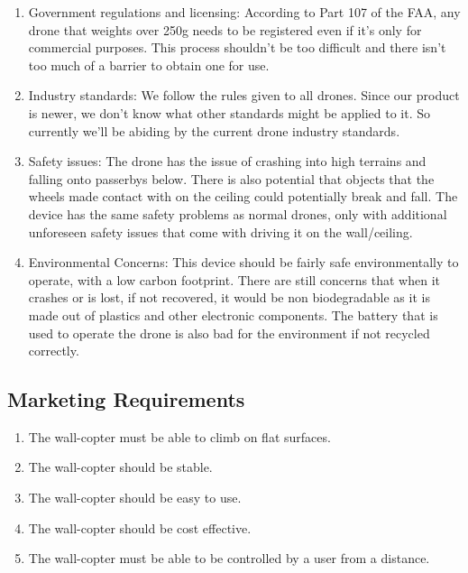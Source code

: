 \documentclass[12pt]{article}
\begin{document}
\begin{enumerate}[label=\Alph*.]
\begin{enumerate}[label=\roman*.]
                    \item Government regulations and licensing: According to Part 107 of the FAA, any drone that weights over 250g needs to be registered even if it's only for commercial purposes. This process shouldn't be too difficult and there isn't too much of a barrier to obtain one for use.
                    \item Industry standards: We follow the rules given to all drones. Since our product is newer, we don't know what other standards might be applied to it. So currently we'll be abiding by the current drone industry standards.
                    \item Safety issues: The drone has the issue of crashing into high terrains and falling onto passerbys below. There is also potential that objects that the wheels made contact with on the ceiling could potentially break and fall. The device has the same safety problems as normal drones, only with additional unforeseen safety issues that come with driving it on the wall/ceiling.
                    \item Environmental Concerns: This device should be fairly safe environmentally to operate, with a low carbon footprint. There are still concerns that when it crashes or is lost, if not recovered, it would be non biodegradable as it is made out of plastics and other electronic components. The battery that is used to operate the drone is also bad for the environment if not recycled correctly.
                \end{enumerate}
            \end{enumerate}
        \newpage

        \subsection{Marketing Requirements}
            \begin{enumerate}[label=\arabic*.]
                \item The wall-copter must be able to climb on flat surfaces.
                \item The wall-copter should be stable.
                \item The wall-copter should be easy to use.
                \item The wall-copter should be cost effective.
                \item The wall-copter must be able to be controlled by a user from a distance.
            \end{enumerate}
        
\end{document}
